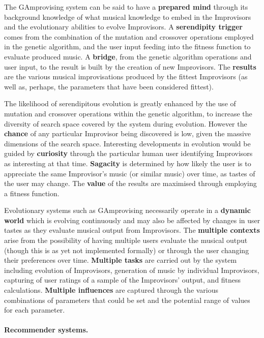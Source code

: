 The GAmprovising system can be said to have a \textbf{prepared mind} through its background knowledge of what musical knowledge to embed in the Improvisors and the evolutionary abilities to evolve Improvisors. A \textbf{serendipity trigger} comes from the combination of the mutation and crossover operations employed in the genetic algorithm, and the user input feeding into the fitness function to evaluate produced music. A \textbf{bridge}, from the genetic algorithm operations and user input, to the result is built by the creation of new Improvisors. The \textbf{results} are the various musical improvisations produced by the fittest Improvisors (as well as, perhaps, the parameters that have been considered fittest).

The likelihood of serendipitous evolution is greatly enhanced by the use of mutation and crossover operations within the genetic algorithm, to increase the diversity of search space covered by the system during evolution. However the \textbf{chance} of any particular Improvisor being discovered is low, given the massive dimensions of the search space.  Interesting developments in evolution would be guided by \textbf{curiosity} through the particular human user identifying Improvisors as interesting at that time. \textbf{Sagacity} is determined by how likely the user is to appreciate the same Improvisor's music (or similar music) over time, as tastes of the user may change. The \textbf{value} of the results are maximised through employing a fitness function.

Evolutionary systems such as GAmprovising necessarily operate in a \textbf{dynamic world} which is evolving continuously and may also be affected by changes in user tastes as they evaluate musical output from Improvisors. The \textbf{multiple contexts} arise from the possibility of having multiple users evaluate the musical output (though this is as yet not implemented formally) or through the user changing their preferences over time. \textbf{Multiple tasks} are carried out by the system including evolution of Improvisors, generation of music by individual Improvisors, capturing of user ratings of a sample of the Improvisors' output, and fitness calculations. \textbf{Multiple influences} are captured through the various combinations of parameters that could be set and the potential range of values for each parameter.


\paragraph{Recommender systems.} 

